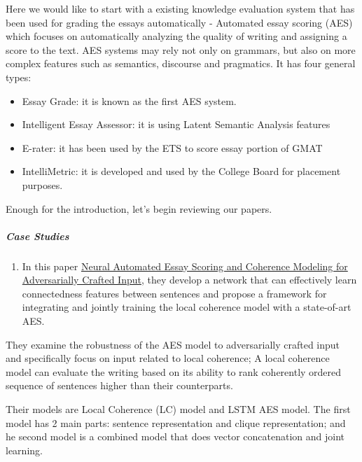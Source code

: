 \documentclass[]{book}
\providecommand{\tightlist}{%
  \setlength{\itemsep}{0pt}\setlength{\parskip}{0pt}}
\let\oldsubparagraph\subparagraph
\renewcommand{\subparagraph}[1]{\oldsubparagraph{#1}\mbox{}}
\theoremstyle{definition}
\theoremstyle{definition}
\theoremstyle{definition}
\theoremstyle{remark}
\begin{document}
Here we would like to start with a existing knowledge evaluation system
that has been used for grading the essays automatically - Automated
essay scoring (AES) which focuses on automatically analyzing the quality
of writing and assigning a score to the text. AES systems may rely not
only on grammars, but also on more complex features such as semantics,
discourse and pragmatics. It has four general types:

\begin{itemize}
\item
  Essay Grade: it is known as the first AES system.
\item
  Intelligent Essay Assessor: it is using Latent Semantic Analysis
  features
\item
  E-rater: it has been used by the ETS to score essay portion of GMAT
\item
  IntelliMetric: it is developed and used by the College Board for
  placement purposes.
\end{itemize}

Enough for the introduction, let's begin reviewing our papers.

\subparagraph{Case Studies}\label{case-studies-4}

\begin{enumerate}
\def\labelenumi{\arabic{enumi}.}
\tightlist
\item
  In this paper \href{http://aclweb.org/anthology/N18-1024}{Neural
  Automated Essay Scoring and Coherence Modeling for Adversarially
  Crafted Input}, they develop a network that can effectively learn
  connectedness features between sentences and propose a framework for
  integrating and jointly training the local coherence model with a
  state-of-art AES.
\end{enumerate}

They examine the robustness of the AES model to adversarially crafted
input and specifically focus on input related to local coherence; A
local coherence model can evaluate the writing based on its ability to
rank coherently ordered sequence of sentences higher than their
counterparts.

Their models are Local Coherence (LC) model and LSTM AES model. The
first model has 2 main parts: sentence representation and clique
representation; and he second model is a combined model that does vector
concatenation and joint learning.
\end{document}
